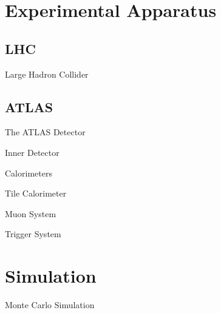 \documentclass[aspectratio=169,xcolor=table]{beamer}
\begin{document}
\section{Experimental Apparatus }

  \subsection{LHC }

    \begin{frame}[t]{Large Hadron Collider}

    \end{frame}

  \subsection{ATLAS }

    \begin{frame}[t]{The ATLAS Detector}

    \end{frame}

    \begin{frame}[t]{Inner Detector}

    \end{frame}

    \begin{frame}[t]{Calorimeters}

    \end{frame}

    \begin{frame}[t]{Tile Calorimeter}

    \end{frame}

    \begin{frame}[t]{Muon System}

    \end{frame}

    \begin{frame}[t]{Trigger System}

    \end{frame}

\section{Simulation }
  
  \begin{frame}[t]{Monte Carlo Simulation}

  \end{frame}
\end{document}
